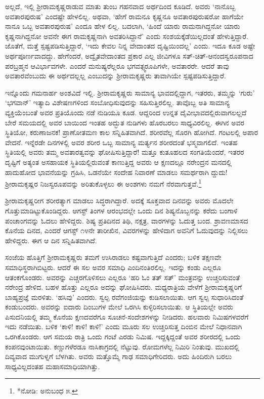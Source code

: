 ಅಲ್ಲದೆ, ಇಲ್ಲಿ ಶ್ರೀರಾಮಕೃಷ್ಣರಾಡುವ ಮಾತು ತುಂಬ ಗಹನವಾದ ಅರ್ಥದಿಂದ ಕೂಡಿದೆ. ಅವರು ‘ನಾನೊಬ್ಬ ಅವತಾರಪುರುಷ’ ಎಂದಷ್ಟೇ ಹೇಳಲಿಲ್ಲ. ಅಥವಾ, ‘ಹೇಗೆ ರಾಮನೂ ಕೃಷ್ಣನೂ ಅವತಾರಪುರುಷರೋ ಹಾಗೆಯೇ ನಾನೂ ಒಬ್ಬ ಅವತಾರಪುರುಷ’ ಎಂದೂ ಹೇಳ ಲಿಲ್ಲ. ಬದಲಾಗಿ, ‘ಹಿಂದೆ ಯಾರು ರಾಮನಾಗಿದ್ದನೋ ಯಾರು ಕೃಷ್ಣನಾಗಿದ್ದನೋ ಅವನೇ ಈಗ ರಾಮಕೃಷ್ಣನಾಗಿ ಅವತರಿಸಿದ್ದಾನೆ’ ಎಂದು ಸಂಶಯಕ್ಕೆಡೆಯಿಲ್ಲದಂತೆ ಹೇಳುತ್ತಿದ್ದಾರೆ. ಜೊತೆಗೆ, ಮತ್ತೆ ಸ್ಪಷ್ಟಪಡಿಸುತ್ತಿದ್ದಾರೆ, ‘ಇದು ಕೇವಲ ನಿನ್ನ ವೇದಾಂತದ ದೃಷ್ಟಿಯಿಂದಲ್ಲ’ ಎಂದು. ಇದೂ ಕೂಡ ಅಷ್ಟೇ ಅರ್ಥಪೂರ್ಣವಾದದ್ದು. ಹೇಗೆಂದರೆ, ಅದ್ವೈತವೇದಾಂತದ ಪ್ರಕಾರ ಎಲ್ಲ ಜೀವಿಗಳೂ ಸತ್-ಚಿತ್-ಆನಂದಸ್ವರೂಪನಾದ ಪರಬ್ರಹ್ಮನ ಆವಿರ್ಭಾವಗಳೇ. ಎಂದರೆ ಮನುಷ್ಯರೆಲ್ಲರೂ ಭಗವತ್ಸ್ವರೂಪಿಗಳೇ, ಅವತಾರರೇ. ಆದರೆ ತಾವು ಅವತಾರವೆಂಬುದು ಈ ಅರ್ಥದಲ್ಲಲ್ಲ ಎಂಬುದನ್ನು ಶ್ರೀರಾಮಕೃಷ್ಣರು ತಾವಾಗಿಯೇ ಸ್ಪಷ್ಟಪಡಿಸುತ್ತಿದ್ದಾರೆ.

ಇನ್ನೊಂದು ಗಮನಾರ್ಹ ಅಂಶವಿದೆ ಇಲ್ಲಿ. ಶ್ರೀರಾಮಕೃಷ್ಣರು ಸಾಮಾನ್ಯ ಭಾವದಲ್ಲಿದ್ದಾಗ, ಇತರರು, ತಮ್ಮನ್ನು ‘ಗುರು’ ‘ಭಗವಾನ್’ ಇತ್ಯಾದಿ ವಿಶೇಷಣಗಳಿಂದ ಸಂಬೋಧಿಸುವುದನ್ನು ಸಹಿಸುತ್ತಿರಲಿಲ್ಲ. ತಾವೊಬ್ಬ ಅತಿ ಸಾಮಾನ್ಯ ವ್ಯಕ್ತಿಯೆಂಬಂತೆ ಅವರ ಪ್ರತಿಯೊಂದು ನಡೆ ನುಡಿಯೂ ಕೂಡ. ಆದ್ದರಿಂದ ಉನ್ನತ ದೈವೀಭಾವದಲ್ಲಿರುವಾಗಲಲ್ಲದೆ ಬೇರೆ ಸಮಯದಲ್ಲಿ ಅವರ ಬಾಯಿಂದ ಇಂತಹ ಅದ್ಭುತ ನುಡಿಗಳು ಹೊರಬರಲು ಸಾಧ್ಯವಿರಲಿಲ್ಲ. ಈಗಿನ ಅವರ ಸ್ಥಿತಿಯೋ, ಕರುಣಾಜನಕ! ಪ್ರಾಣೋತ­ಮಣ ಕಾಲ ಸನ್ನಿಹಿತವಾಗಿದೆ. ಶರೀರವೆಲ್ಲ ಸೊರಗಿ ಹೋಗಿದೆ. ಗಂಟಲಲ್ಲಿ ಅಪಾರ ವೇದನೆ. ಇನ್ನೆರಡೇ ದಿನಗಳಲ್ಲಿ ಅವರ ಶರೀರ ಒಬ್ಬ ಸಾಮಾನ್ಯ ಮರ್ತ್ಯನ ಶರೀರದಂತೆ ಭಸ್ಮವಾಗಲಿದೆ. ಇಂತಹ ಸ್ಥಿತಿಯಲ್ಲಿ ಅವರು ತಮ್ಮ ಅವತಾರತ್ವವನ್ನು ಘೋಷಿಸುತ್ತಿದ್ದಾರೆ! ಮತ್ತೂ ಕುತೂಹಲದ ಸಂಗತಿಯೆಂದರೆ, ಇತರರ ದೃಷ್ಟಿಗೆ ಅತ್ಯಂತ ಅಸಹಾಯಕ ಸ್ಥಿತಿಯಲ್ಲಿರುವಂತೆ ಕಾಣುತ್ತಿದ್ದ ಅವರು ಆ ಕ್ಷಣದಲ್ಲೂ ನರೇಂದ್ರನ ಮನದಲ್ಲಿ ಹಾದುಹೋದ ಭಾವನೆಯನ್ನು ಗ್ರಹಿಸಿ, ಒಡನೆಯೇ ಸಂದೇಹ ನಿವಾರಣೆ ಮಾಡಲು ಸಮರ್ಥರಾಗಿ ದ್ದುದು! ಶ್ರೀರಾಮಕೃಷ್ಣರ ನಿಜಸ್ವರೂಪವನ್ನು ಅರಿತುಕೊಳ್ಳಲು ಈ ಅಂಶಗಳು ನಮಗೆ ನೆರವಾಗುತ್ತವೆ.\footnote{*ನೋಡಿ: ಅನುಬಂಧ ೫.}

ಶ್ರೀರಾಮಕೃಷ್ಣರೀಗ ಶರೀರತ್ಯಾಗ ಮಾಡಲು ಸಿದ್ಧರಾಗಿದ್ದಾರೆ. ಅದಕ್ಕೆ ಸೂಕ್ತವಾದ ದಿನವನ್ನು ಅವರು ಮೊದಲೇ ಗೊತ್ತುಮಾಡಿಟ್ಟುಕೊಂಡಿದ್ದರು. ಆಗಸ್ಟ್ ತಿಂಗಳ ಆರಂಭದಲ್ಲೇ ಒಂದು ದಿನ ಶಿಷ್ಯನೊಬ್ಬನನ್ನು ಕರೆದು ಬಂಗಾಳಿ ಪಂಚಾಂಗವನ್ನು ಓದಲು ಹೇಳಿದ್ದರು. ಶಿಷ್ಯ ಪ್ರತಿದಿನದ ತಿಥಿ, ನಕ್ಷತ್ರ, ವಾರಗಳನ್ನು ಓದುತ್ತ ಬಂದ. ಶ್ರಾವಣಮಾಸದ ಕೊನೆಯ ದಿನದ, ಎಂದರೆ ಆಗಸ್ಟ್ ೧೪ನೇ ತಾರೀಖಿನ, ವಿವರಗಳನ್ನು ಹೇಳಿದಾಗ ಅವನಿಗೆ ಓದುವುದನ್ನು ನಿಲ್ಲಿಸಲು ಹೇಳಿದ್ದರು. ಈಗ ಆ ದಿನ ಸನ್ನಿಹಿತವಾಗಿದೆ.

ಸಂಜೆಯ ಹೊತ್ತಿಗೆ ಶ್ರೀರಾಮಕೃಷ್ಣರು ತಮಗೆ ಉಸಿರಾಡಲು ಕಷ್ಟವಾಗುತ್ತಿದೆ ಎಂದರು; ಬಳಿಕ ತಕ್ಷಣವೇ ಸಮಾಧಿಸ್ಥರಾಗಿಬಿಟ್ಟರು. ಆದರೆ ಈ ಸಲ ಅವರ ಸಮಾಧಿ ಎಂದಿನಂತಿರಲಿಲ್ಲ. ಇದನ್ನು ಕಂಡು ಎಲ್ಲರೂ ಆತಂಕಗೊಂಡರು. ಅವರನ್ನು ಎಚ್ಚರಗೊಳಿಸಲು ಎಲ್ಲರೂ ‘ಹರಿ ಓಂ ತತ್ ಸತ್’ ಮಂತ್ರವನ್ನು ಉಚ್ಚರಿಸುವಂತೆ ನರೇಂದ್ರ ಹೇಳಿದ. ಬಹಳ ಹೊತ್ತು ಎಲ್ಲರೂ ಅದನ್ನು ಘೋಷಿಸಿದರು. ಮಧ್ಯರಾತ್ರಿಯ ವೇಳೆಗೆ ಶ್ರೀರಾಮಕೃಷ್ಣರಿಗೆ ಬಾಹ್ಯಪ್ರಜ್ಞೆ ಮರಳಿತು. ‘ಹಸಿವು’ ಎಂದರು. ಸ್ವಲ್ಪ ರವೆಗಂಜಿಯನ್ನು ಕುಡಿಸಲಾಯಿತು. ಆಗ ಸ್ವಲ್ಪ ಸುಧಾರಿಸಿದಂತೆ ಕಂಡುಬಂದರು. ಅವರನ್ನು ಐದಾರು ದಿಂಬುಗಳ ಮೇಲೆ ಒರಗಿಸಿ ಕುಳ್ಳಿರಿಸಲಾಯಿತು. ಆ ಸ್ಥಿತಿಯಲ್ಲೇ ಅವರು ಪಿಸುದನಿಯಲ್ಲಿ ತಮ್ಮ ಕೊನೆಯ ಕ್ಷಣದವರೆಗೂ ಸೂಚನೆ-ಸಂದೇಶಗಳನ್ನು ನೀಡಿದರು. ಹಲವಾರು ನಿಮಿಷಗಳವರೆಗೆ ಇದು ನಡೆಯಿತು. ಬಳಿಕ ‘ಕಾಳಿ! ಕಾಳಿ! ಕಾಳಿ!’ ಎಂದು ಮೂರು ಸಲ ಉಚ್ಚರಿಸುತ್ತ ದಿಂಬಿನ ಮೇಲೆ ನಿಧಾನವಾಗಿ ಒರಗಿಕೊಂಡರು. ಆಗ ಸಮಯ ರಾತ್ರಿ ಒಂದು ಗಂಟೆ ಎರಡು ನಿಮಿಷ. ಇದ್ದಕ್ಕಿದ್ದಂತೆ ಅವರ ಶರೀರದಲ್ಲಿ ಒಂದು ಕಂಪನವುಂಟಾಯಿತು. ಕಣ್ಣುಗಳೆರಡೂ ನಾಸಿಕಾಗ್ರದಲ್ಲಿ ನೆಟ್ಟುವು. ರೋಮಗಳೆಲ್ಲ ನಿಮಿರಿ ನಿಂತುವು. ಮುಖದಲ್ಲಿ ದಿವ್ಯವಾದ ಮುಗುಳ್ನಗೆ ಬೆಳಗಿತು. ಅವರು ಮತ್ತೊಮ್ಮೆ ಗಾಢ ಸಮಾಧಿಗೇರಿದರು. ಅದು ಹಿಂದಿರುಗಿ ಬರಲು ಸಾಧ್ಯವಿಲ್ಲದಂತಹ ಮಹಾಸಮಾಧಿಯಾಗಿತ್ತು.

